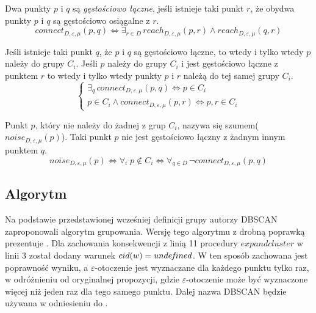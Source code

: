 

\newpage{}\newline
Dwa punkty $ p $ i $ q $ są \textit{gęstościowo łączne}, jeśli istnieje taki punkt $ r $, że obydwa punkty $ p $ i $ q $ są gęstościowo osiągalne z $ r $.
\begin{equation}
	connect_{D,\varepsilon,\mu}(p, q) \iff \exists_{r\in D}\,reach_{D,\varepsilon,\mu}(p, r) \land reach_{D,\varepsilon,\mu}(q, r)
\end{equation}

\newline
Jeśli istnieje taki punkt $ q $, że $ p $ i $ q $ są gęstościowo łączne, to wtedy i tylko wtedy $ p $ należy do grupy $ C_i $. Jeśli $ p $ należy do grupy $ C_i $ i jest gęstościowo łączne z punktem $ r $ to wtedy i tylko wtedy punkty $ p $ i $ r $ należą do tej samej grupy $ C_i $.
\begin{equation}\label{eq:cluster-def}
\left\{
\begin{array}{l}
\exists_q\,connect_{D,\varepsilon,\mu}(p,q) \iff p\in C_i \\
p \in C_i \land connect_{D,\varepsilon,\mu}(p,r) \iff p,r\in C_i 
\end{array}
\right.
\end{equation}

\newline
Punkt $ p $, który nie należy do żadnej z grup $ C_i $, nazywa się szumem\linebreak ($ noise_{D,\varepsilon,\mu}(p) $). Taki punkt $ p $ nie jest gęstościowo łączny z żadnym innym punktem $ q $.
\begin{equation}
	noise_{D,\varepsilon,\mu}(p) \iff \forall_i \;p\notin C_i \iff \forall_{q \in D} \,\neg connect_{D,\varepsilon,\mu}(p,q)
\end{equation}
	
\subsection{Algorytm}
Na podstawie przedstawionej wcześniej definicji grupy autorzy DBSCAN zaproponowali algorytm grupowania. Wersję tego algorytmu z drobną poprawką prezentuje . Dla zachowania konsekwencji z linią 11 procedury $ expandcluster $ w linii 3 został dodany warunek $ cid(w) = unde\hspace{-0.1em}f\hspace{-0.1em}{}ined $. W ten sposób zachowana jest poprawność wyniku, a $ \varepsilon $-otoczenie jest wyznaczane dla każdego punktu tylko raz, w odróżnieniu od oryginalnej propozycji, gdzie $ \varepsilon $-otoczenie może być wyznaczone więcej niż jeden raz dla tego samego punktu. Dalej nazwa DBSCAN będzie używana w odniesieniu do .


